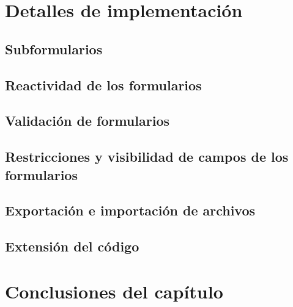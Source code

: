 \section{Detalles de implementación}
\subsection{Subformularios }
\subsection{Reactividad de los formularios}
\subsection{Validación de formularios}
\subsection{Restricciones y visibilidad de campos de los formularios}
\subsection{Exportación e importación de archivos}
\subsection{Extensión del código}
\section{Conclusiones del capítulo}